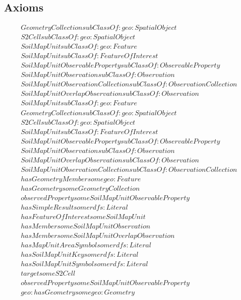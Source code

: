 \subsection{Axioms}
\begin{align}
  GeometryCollection subClassOf: geo:SpatialObject\\
  S2Cell subClassOf: geo:SpatialObject\\
  SoilMapUnit subClassOf: geo:Feature\\
  SoilMapUnit subClassOf: FeatureOfInterest\\
  SoilMapUnitObservableProperty subClassOf: ObservableProperty\\
  SoilMapUnitObservation subClassOf: Observation\\
  SoilMapUnitObservationCollection subClassOf: ObservationCollection\\
  SoilMapUnitOverlapObservation subClassOf: Observation\\
  SoilMapUnit subClassOf: geo:Feature\\
  GeometryCollection subClassOf: geo:SpatialObject\\
  S2Cell subClassOf: geo:SpatialObject\\
  SoilMapUnit subClassOf: FeatureOfInterest\\
  SoilMapUnitObservableProperty subClassOf: ObservableProperty\\
  SoilMapUnitObservation subClassOf: Observation\\
  SoilMapUnitOverlapObservation subClassOf: Observation\\
  SoilMapUnitObservationCollection subClassOf: ObservationCollection\\
  hasGeometryMember some geo:Feature \\
  hasGeometry some GeometryCollection \\
  observedProperty some SoilMapUnitObservableProperty \\
  hasSimpleResult some rdfs:Literal \\
  hasFeatureOfInterest some SoilMapUnit \\
  hasMember some SoilMapUnitObservation \\
  hasMember some SoilMapUnitOverlapObservation \\
  hasMapUnitAreaSymbol some rdfs:Literal \\
  hasSoilMapUnitKey some rdfs:Literal \\
  hasSoilMapUnitSymbol some rdfs:Literal \\
  target some S2Cell \\
  observedProperty some SoilMapUnitObservableProperty \\
  geo:hasGeometry some geo:Geometry \end{align}


